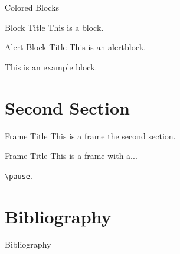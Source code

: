 \documentclass{beamer}
\begin{document}
    \begin{frame}{Colored Blocks}
        \begin{block}{Block Title}
            This is a block.
        \end{block}

        \begin{alertblock}{Alert Block Title}
            This is an alertblock.
        \end{alertblock}

        \begin{example}
            This is an example block.
        \end{example}
    \end{frame}




\section{Second Section}

    \begin{frame}{Frame Title}
        This is a frame the second section.
    \end{frame}

    \begin{frame}{Frame Title}
        This is a frame with a...

        \pause

        \texttt{\textbackslash pause}.
    \end{frame}

\section{Bibliography}

    \nocite{einstein, knuthwebsite, latexcompanion}
    
    \begin{frame}{Bibliography}
        
        
    \end{frame}
\end{document}
